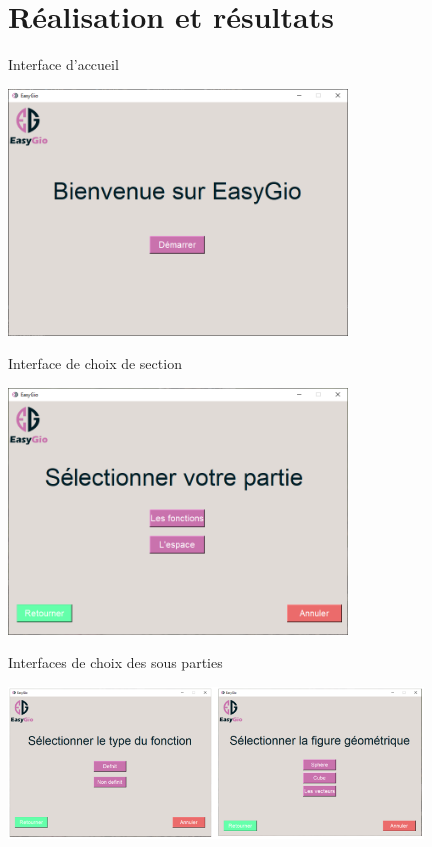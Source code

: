 \documentclass{beamer}
\begin{document}
\section{Réalisation et résultats}
\begin{frame}{Interface d'accueil}
\begin{center}
    \includegraphics[width=9cm]{pic/Interface1.PNG}
\end{center}
\end{frame}
\begin{frame}{Interface de choix de section}
\begin{center}
    \includegraphics[width=9cm]{pic/Interface2.PNG}
\end{center}
\end{frame}
\begin{frame}{Interfaces de choix des sous parties}
\begin{center}
    \includegraphics[width=11cm]{pic/TypesCaptures.PNG}
\end{center}
\end{frame}
\end{document}
